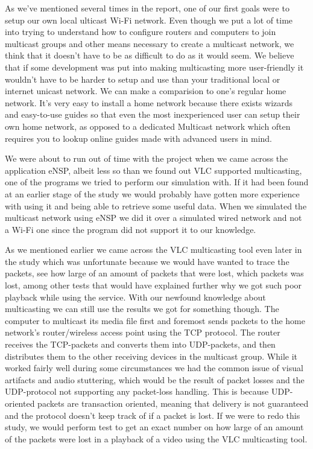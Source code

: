 \documentclass[9pt,a4paper]{acmproc}
\begin{document}
As we’ve mentioned several times in the report, one of our first goals were to setup our own local ulticast Wi-Fi network. Even though we put a lot of time into trying to understand how to configure routers and computers to join multicast groups and other means necessary to create a multicast network, we think that it doesn’t have to be as difficult to do as it would seem. We believe that if some development was put into making multicasting more user-friendly it wouldn’t have to be harder to setup and use than your traditional local or internet unicast network. We can make a comparision to one’s regular home network. It’s very easy to install a home network because there exists wizards and easy-to-use guides so that even the most inexperienced user can setup their own home network, as opposed to a dedicated Multicast network which often requires you to lookup online guides made with advanced users in mind. 

We were about to run out of time with the project when we came across the application eNSP, albeit less so than we found out VLC supported multicasting, one of the programs we tried to perform our simulation with. If it had been found at an earlier stage of the study we would probably have gotten more experience with using it and being able to retrieve some useful data. When we simulated the multicast network using eNSP we did it over a simulated wired network and not a Wi-Fi one since the program did not support it to our knowledge. 

As we mentioned earlier we came across the VLC multicasting tool even later in the study which was unfortunate because we would have wanted to trace the packets, see how large of an amount of packets that were lost, which packets was lost, among other tests that would have explained further why we got such poor playback while using the service. With our newfound knowledge about multicasting we can still use the results we got for something though. The computer to multicast its media file first and foremost sends packets to the home network’s router/wireless access point using the TCP protocol. The router receives the TCP-packets and converts them into UDP-packets, and then distributes them to the other receiving devices in the multicast group. While it worked fairly well during some circumstances we had the common issue of visual artifacts and audio stuttering, which would be the result of packet losses and the UDP-protocol not supporting any packet-loss handling. This is because UDP-oriented packets are transaction oriented, meaning that delivery is not guaranteed and the protocol doesn’t keep track of if a packet is lost. If we were to redo this study, we would perform test to get an exact number on how large of an amount of the packets were lost in a playback of a video using the VLC multicasting tool. \cite{udpSource}
\end{document}
